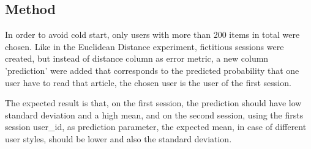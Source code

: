 \documentclass[ecp,tc,english]{iiufrgs}
\begin{document}
        \subsection{Method}
        In order to avoid cold start, only users with more than 200 items in total were chosen.
        Like in the Euclidean Distance experiment, fictitious sessions were created, but instead of distance column as error metric, a new column 'prediction' were added that corresponds to the predicted probability that one user have to read that article, the chosen user is the user of the first session.
        

        The expected result is that, on the first session, the prediction should have low standard deviation and a high mean, and on the second session, using the firsts session user\_id, as prediction parameter, the expected mean, in case of different user styles, should be lower and also the standard deviation.
        
        \newpage 
        
\end{document}
